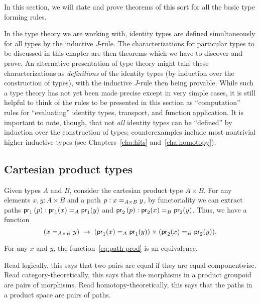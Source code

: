 In this section, we will state and prove theorems of this sort for all the basic type forming rules.

\begin{rmk}\label{rmk:computational-hope}
  In the type theory we are working with, identity types are defined simultaneously for all types by the inductive $J$-rule.
  The characterizations for particular types to be discussed in this chapter are then theorems which we have to discover and prove.
  An alternative presentation of type theory might take these characterizations as \emph{definitions} of the identity types (by induction over the construction of types), with the inductive $J$-rule then being provable.
  While such a type theory has not yet been made precise except in very simple cases, it is still helpful to think of the rules to be presented in this section as ``computation'' rules for ``evaluating'' identity types, transport, and function application.
  It is important to note, though, that not \emph{all} identity types can be ``defined'' by induction over the construction of types; counterexamples include most nontrivial higher inductive types (see Chapters~\ref{cha:hits} and~\ref{cha:homotopy}).
\end{rmk}

\subsection{Cartesian product types}
\label{sec:compute-cartprod}

Given types $A$ and $B$, consider the cartesian product type $A \times B$.  
For any elements $x,y:A\times B$ and a path $p:\id[A\times B]{x}{y}$, by functoriality we can extract paths $\ap{\proj1}p:\id[A]{\proj1(x)}{\proj1(y)}$ and $\ap{\proj2}p:\id[B]{\proj2(x)}{\proj2(y)}$.
Thus, we have a function
\begin{equation}
  (\id[A\times B]{x}{y}) \;\to\; (\id[A]{\proj1(x)}{\proj1(y)}) \times (\id[B]{\proj2(x)}{\proj2(y)}).\label{eq:path-prod}
\end{equation}

\begin{thm}\label{thm:path-prod}
  For any $x$ and $y$, the function~\eqref{eq:path-prod} is an equivalence.
\end{thm}

Read logically, this says that two pairs are equal if they are equal
componentwise.  Read category-theoretically, this says that the
morphisms in a product groupoid are pairs of morphisms.  Read
homotopy-theoretically, this says that the paths in a product
space are pairs of paths.

